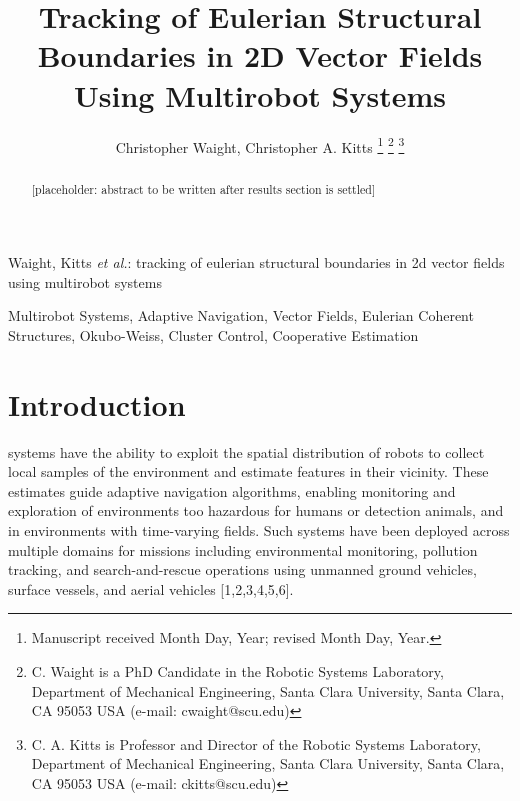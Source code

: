 \documentclass[lettersize,journal]{IEEEtran}
\begin{document}
\title{Tracking of Eulerian Structural Boundaries in 2D Vector Fields Using Multirobot Systems}
\author{Christopher Waight, Christopher A. Kitts 
\thanks{Manuscript received Month Day, Year; revised Month Day, Year.}
\thanks{C. Waight is a PhD Candidate in the Robotic Systems Laboratory, Department of Mechanical Engineering, Santa Clara University, Santa Clara, CA 95053 USA (e-mail: cwaight@scu.edu)}
\thanks{C. A. Kitts is Professor and Director of the Robotic Systems Laboratory, Department of Mechanical Engineering, Santa Clara University, Santa Clara, CA 95053 USA (e-mail: ckitts@scu.edu)}
}
%
{Waight, Kitts \MakeLowercase{\textit{et al.}: Tracking of Eulerian Structural Boundaries in 2D Vector Fields Using Multirobot Systems}}


\maketitle

\begin{abstract}
    [placeholder: abstract to be written after results section is settled]
\end{abstract}

\begin{IEEEkeywords}
Multirobot Systems, Adaptive Navigation, Vector Fields, Eulerian Coherent Structures, Okubo-Weiss, Cluster Control, Cooperative Estimation
\end{IEEEkeywords}


\section{Introduction}

 systems have the ability to exploit the spatial distribution of robots to collect local samples of the environment and estimate features in their vicinity. These estimates guide adaptive navigation algorithms, enabling monitoring and exploration of environments too hazardous for humans or detection animals, and in environments with time-varying fields. Such systems have been deployed across multiple domains for missions including environmental monitoring, pollution tracking, and search-and-rescue operations using unmanned ground vehicles, surface vessels, and aerial vehicles [1,2,3,4,5,6].
\end{document}
